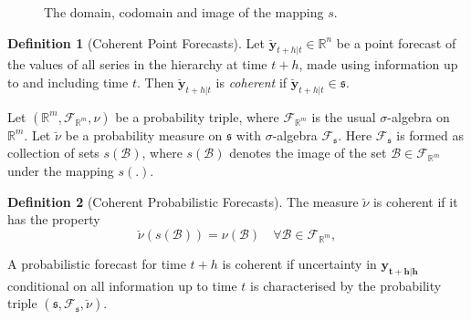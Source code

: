 \documentclass[a4paper, 11pt]{article}
\theoremstyle{theo}
\theoremstyle{definition}
\newtheorem{definition}{Definition}[section]
\begin{document}
\begin{figure}[H]
  \begin{center}
    \newline
  \end{center}
  \caption{The domain, codomain and image of the mapping $s$.}\label{fig2}
\end{figure}

\begin{definition}[Coherent Point Forecasts]\label{def:cohpoint}
  Let $\breve{\bm{y}}_{t+h|t} \in \mathbb{R}^n$ be a point forecast of the values of all series in the hierarchy at time $t+h$,  made using information up to and including time $t$.  Then $\breve{\bm{y}}_{t+h|t}$ is \emph{coherent} if $\breve{\bm{y}}_{t+h|t} \in \mathfrak{s}$. 
\end{definition}

Let $(\mathbb{R}^m, \mathscr{F}_{\mathbb{R}^m}, \nu)$ be a probability triple, where $\mathscr{F}_{\mathbb{R}^m}$ is the usual $\sigma$-algebra on $\mathbb{R}^m$. Let $\breve{\nu}$ be a probability measure on $\mathfrak{s}$ with $\sigma$-algebra $\mathscr{F}_{\mathfrak{s}}$.  Here $\mathscr{F}_{\mathfrak{s}}$ is formed as collection of sets $s(\mathcal{B})$, where $s(\mathcal{B})$ denotes the image of the set $\mathcal{B}\in \mathscr{F}_{\mathbb{R}^m}$ under the mapping $s(.)$.

\begin{definition}[Coherent Probabilistic Forecasts]\label{def:cohprob}
  The measure $\breve{\nu}$ is coherent if it has the property
  $$
      \breve{\nu}(s(\mathcal{B})) = \nu(\mathcal{B}) \quad \forall  \mathcal{B} \in \mathscr{F}_{\mathbb{R}^m},
    $$    
\end{definition}
A probabilistic forecast for time $t+h$ is coherent if uncertainty in $\bm{y_{t+h|h}}$ conditional on all information up to time $t$ is characterised by the probability triple $(\mathfrak{s},\mathscr{F}_{\mathfrak{s}},\breve{\nu})$.
\end{document}
